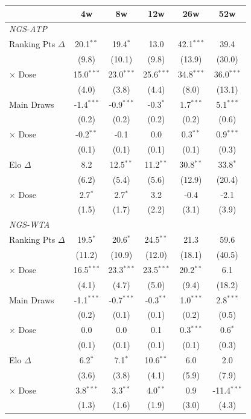 \begin{tabular}{l*{5}{c}}
\toprule
 & 4w & 8w & 12w & 26w & 52w \\
\midrule
\multicolumn{6}{l}{\textit{NGS-ATP}} \\
  Ranking Pts $\Delta$ & 20.1$^{**}$ & 19.4$^{*}$ & 13.0 & 42.1$^{***}$ & 39.4 \\
  & (9.8) & (10.1) & (9.8) & (13.9) & (30.0) \\
  $\times$ Dose & 15.0$^{***}$ & 23.0$^{***}$ & 25.6$^{***}$ & 34.8$^{***}$ & 36.0$^{***}$ \\
  & (4.0) & (3.8) & (4.4) & (8.0) & (13.1) \\[0.3em]
  Main Draws & -1.4$^{***}$ & -0.9$^{***}$ & -0.3$^{*}$ & 1.7$^{***}$ & 5.1$^{***}$ \\
  & (0.2) & (0.2) & (0.2) & (0.2) & (0.6) \\
  $\times$ Dose & -0.2$^{**}$ & -0.1 & 0.0 & 0.3$^{**}$ & 0.9$^{***}$ \\
  & (0.1) & (0.1) & (0.1) & (0.1) & (0.3) \\[0.3em]
  Elo $\Delta$ & 8.2 & 12.5$^{**}$ & 11.2$^{**}$ & 30.8$^{**}$ & 33.8$^{*}$ \\
  & (6.2) & (5.4) & (5.6) & (12.9) & (20.4) \\
  $\times$ Dose & 2.7$^{*}$ & 2.7$^{*}$ & 3.2 & -0.4 & -2.1 \\
  & (1.5) & (1.7) & (2.2) & (3.1) & (3.9) \\[0.3em]
\midrule
\multicolumn{6}{l}{\textit{NGS-WTA}} \\
  Ranking Pts $\Delta$ & 19.5$^{*}$ & 20.6$^{*}$ & 24.5$^{**}$ & 21.3 & 59.6 \\
  & (11.2) & (10.9) & (12.0) & (18.1) & (40.5) \\
  $\times$ Dose & 16.5$^{***}$ & 23.3$^{***}$ & 23.5$^{***}$ & 20.2$^{**}$ & 6.1 \\
  & (4.1) & (4.7) & (5.0) & (9.4) & (18.2) \\[0.3em]
  Main Draws & -1.1$^{***}$ & -0.7$^{***}$ & -0.3$^{**}$ & 1.0$^{***}$ & 2.8$^{***}$ \\
  & (0.2) & (0.1) & (0.1) & (0.2) & (0.5) \\
  $\times$ Dose & 0.0 & 0.0 & 0.1 & 0.3$^{***}$ & 0.6$^{*}$ \\
  & (0.1) & (0.1) & (0.1) & (0.1) & (0.3) \\[0.3em]
  Elo $\Delta$ & 6.2$^{*}$ & 7.1$^{*}$ & 10.6$^{**}$ & 6.0 & 2.0 \\
  & (3.6) & (3.8) & (4.1) & (5.9) & (7.9) \\
  $\times$ Dose & 3.8$^{***}$ & 3.3$^{**}$ & 4.0$^{**}$ & 0.9 & -11.4$^{***}$ \\
  & (1.3) & (1.6) & (1.9) & (3.0) & (4.3) \\[0.3em]
\midrule
\bottomrule
\end{tabular}
